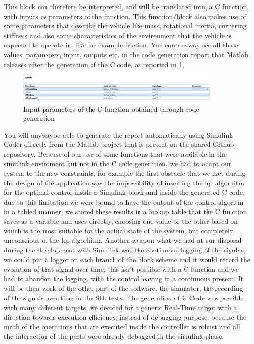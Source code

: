 This block can therefore be interpreted, and will be translated into, a C function, with inputs as parameters of the function. This function/block also makes use of some parameters that describe the vehicle like mass, rotational inertia, cornering stiffness and also some characteristics of the environment that the vehicle is expected to operate in, like for example friction. You can anyway see all those values: parameters, input, outputs etc. in the code generation report that Matlab releases after the generation of the C code, as reported in \ref{Codegen Inports}. 
\begin{figure} \label{Codegen Inports}
		\centering
		\includegraphics[width=0.9\textwidth]{Images/Simulator/codegen-inports}
		\caption{Input parameters of the C function obtained through code generation}	
\end{figure}
You will anywaybe able to generate the report automatically using Simulink Coder directly from the Matlab project that is present on the shared Github repository. Because of our use of some functions that were available in the simulink enviroment but not in the C code generation, we had to adapt our system to the new constraints, for example the first obstacle that we met during the design of the application was the impossibility of inserting the lqr algorhitm for the optimal control inside a Simulink block and inside the generated C code, due to this limitation we were bound to have the output of the control algoritm in a tabled manner, we stored these results in a lookup table that the C function saves as a variable and uses directly, choosing one value or the other based on which is the most suitable for the actual state of the system, but completely unconscious of the lqr algorhitm. Another weapon what we had at our disposal during the development with Simulink was the continuous logging of the signlas, we could put a logger on each branch of the block scheme and it would record the evolution of that signal over time, this isn't possible with a C function and we had to abandon the logging, with the control leaving in a continuous present. It will be then work of the other part of the software, the simulator, the recording of the signals over time in the SIL tests. The generation of C Code was possible with many different targets, we decided for  a generic Real-Time target with a direction towards execution efficiency, instead of debugging purpose, because the math of the operations that are executed inside the controller is robust and all the interaction of the parts were already debugged in the simulink phase.
